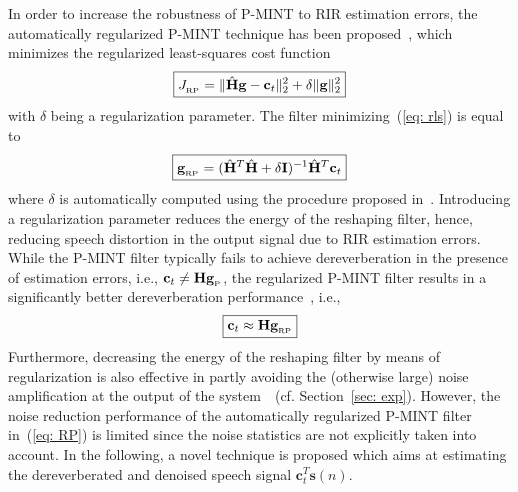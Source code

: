 \documentclass{article}
\begin{document}
In order to increase the robustness of P-MINT to RIR estimation errors, the automatically regularized P-MINT technique has been proposed~\cite{Kodrasi_ITASLP_2013}, which minimizes the regularized least-squares cost function
\begin{equation}
  \label{eq: rls}
\boxed{J_{_{\rm RP}} = \|\hat{\mathbf{H}}\mathbf{g} - \mathbf{c}_t  \|_2^2 + \delta \|\mathbf{g} \|_2^2}
\end{equation}
with $\delta$ being a regularization parameter.
The filter minimizing~(\ref{eq: rls}) is equal to
\begin{equation}
  \label{eq: RP}
  \boxed{\mathbf{g}_{_{\rm RP}} = (\hat{\mathbf{H}}^T\hat{\mathbf{H}} + \delta \mathbf{I})^{-1} \hat{\mathbf{H}}^T\mathbf{c}_t}
\end{equation}
where $\delta$ is automatically computed using the procedure proposed in~\cite{Kodrasi_ITASLP_2013}.
Introducing a regularization parameter reduces the energy of the reshaping filter, hence, reducing speech distortion in the output signal due to RIR estimation errors.
While the P-MINT filter typically fails to achieve dereverberation in the presence of estimation errors, i.e., $  \mathbf{c}_t \neq \mathbf{H}\mathbf{g}_{_{\rm P}}$, the regularized P-MINT filter results in a significantly better dereverberation performance~\cite{Kodrasi_ITASLP_2013}, i.e.,
\begin{equation}
  \label{eq: peir2}
  \boxed{\mathbf{c}_t \approx \mathbf{H}\mathbf{g}_{_{\rm RP}}}
\end{equation}
Furthermore, decreasing the energy of the reshaping filter by means of regularization is also effective in partly avoiding the (otherwise large) noise amplification at the output of the system~\cite{Kodrasi_ITASLP_2013}~(cf. Section~\ref{sec: exp}).
However, the noise reduction performance of the automatically regularized P-MINT filter in~(\ref{eq: RP}) is limited since the noise statistics are not explicitly taken into account.
In the following, a novel technique is proposed which aims at estimating the dereverberated and denoised speech signal $\mathbf{c}_t^T\mathbf{s}(n)$.
\end{document}
